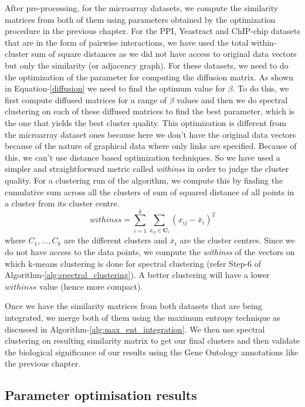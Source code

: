 After pre-processing, for the microarray datasets, we compute the similarity matrices from both of them using parameters obtained by 
the optimization procedure in the previous chapter. For the PPI, Yeastract and ChIP-chip datasets that are in the form 
of pairwise interactions, we have used the total within-cluster sum of square distances as we did not have access to original data vectors but only 
the similarity (or adjacency graph). For these datasets, we need to do the optimization of the parameter for computing the diffusion matrix. 
As shown in Equation-\ref{diffusion} we need to find the optimum value for $\beta$. To do this, we first compute diffused matrices for a range of $\beta$ values 
and then we do spectral clustering on each of these diffused matrices to find the best parameter, which is the one that yields the best cluster quality. This 
optimization is different from the microarray dataset ones because here we don't have the original data vectors because of the nature of graphical data where only 
links are specified. Because of this, we can't use distance based optimization techniques. So we have used a simpler and straightforward metric called \textit{withinss} in order 
to judge the cluster quality. For a clustering run of the algorithm, we compute this by finding the cumulative sum across all the clusters of sum of squared 
distance of all points in a cluster from its cluster centre.
\begin{equation}
    \mathit{withinss}=\sum_{i=1}^{k}\sum_{x_{ij}\in \mathbf{C}_{i}}(x_{ij}-\bar{x}_{i})^2
\end{equation}
where $C_{1},\dots,C_{k}$ are the different clusters and $\bar{x}_{i}$ are the cluster centres. Since we do not have access to the data points, we compute the \textit{withinss} of the vectors on which k-means clustering is done for spectral clustering (refer Step-6 of Algorithm-\ref{alg:spectral_clustering}). A better clustering will have a lower $withinss$ value (hence more compact). 
 
Once we have the similarity matrices from both datasets that are being integrated, we merge both of them using the maximum entropy technique as 
discussed in Algorithm-\ref{alg:max_ent_integration}. We then use spectral clustering on resulting similarity matrix to get our final clusters and then validate 
the biological significance of our results using the Gene Ontology annotations like the previous chapter.

\subsection{Parameter optimisation results}\label{param_optimisation}


